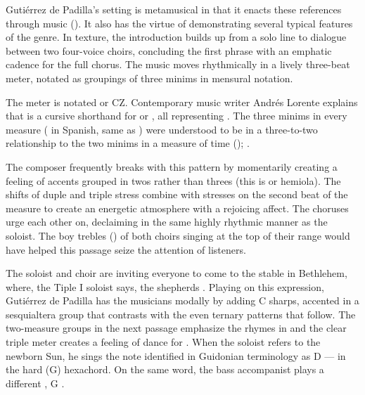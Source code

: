 Gutiérrez de Padilla's setting is metamusical in that it enacts these
references through music ().
It also has the virtue of demonstrating several typical features of the genre.
In texture, the introduction builds up from a solo line to dialogue between two
four-voice choirs, concluding the first phrase with an emphatic cadence for the
full chorus.
The music moves rhythmically in a lively three-beat meter, notated as groupings
of three minims in mensural notation.%
\begin{Footnote}
    The meter is notated \meterCZ{} or CZ.
    Contemporary music writer Andrés Lorente explains that \meterCZ{} is a
    cursive shorthand for \meterCThreeTwo{} or \meterCThree, all representing
    .
    The three minims in every measure ( in Spanish, same as
    ) were understood to be in a three-to-two relationship to the
    two minims in a measure of \meterC{} time ();
    \autocites
    [156, 165, 210]{Lorente:Porque}
    [537]{Cerone:Melopeo}.
\end{Footnote}
The composer frequently breaks with this pattern by momentarily creating a
feeling of accents grouped in twos rather than threes (this is
 or hemiola).
The shifts of duple and triple stress combine with stresses on the second beat
of the measure to create an energetic atmosphere with a rejoicing affect.  
The choruses urge each other on, declaiming in the same highly rhythmic manner
as the soloist.
The boy trebles () of both choirs singing at the top of their
range would have helped this passage seize the attention of listeners.


The soloist and choir are inviting everyone to come to the stable in Bethlehem,
where, the Tiple I soloist says, the shepherds .
Playing on this expression, Gutiérrez de Padilla has the musicians
 modally by adding C sharps, accented in a sesquialtera group that
contrasts with the even ternary patterns that follow.
The two-measure groups in the next passage emphasize the rhymes in
 and the clear triple meter creates a
feeling of dance for .
When the soloist refers to the newborn Sun, he sings the note identified in
Guidonian terminology as D --- in the hard (G)
hexachord.  
On the same word, the bass accompanist plays a different , G
.

